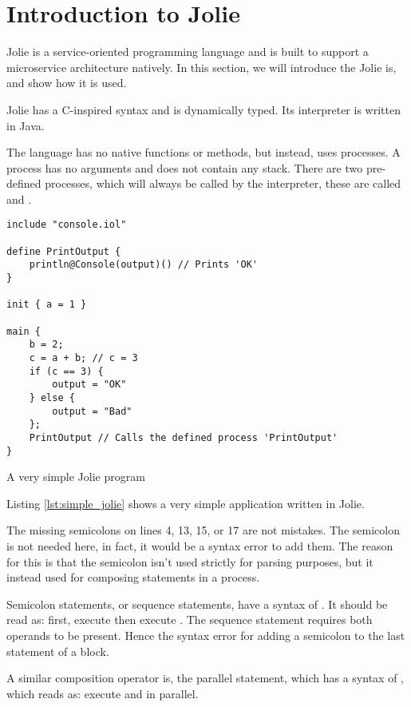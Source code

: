 \section{Introduction to Jolie}

Jolie is a service-oriented programming language and is built to support a
microservice architecture natively. In this section, we will introduce the
Jolie is, and show how it is used.

Jolie has a C-inspired syntax and is dynamically typed. Its interpreter is
written in Java.

The language has no native functions or methods, but instead, uses processes. A
process has no arguments and does not contain any stack. There are two
pre-defined processes, which will always be called by the interpreter, these
are called  and .

\begin{listing}[H]
\begin{verbatim}
include "console.iol"

define PrintOutput {
    println@Console(output)() // Prints 'OK'
}

init { a = 1 }

main {
    b = 2;
    c = a + b; // c = 3
    if (c == 3) {
        output = "OK"
    } else {
        output = "Bad"
    };
    PrintOutput // Calls the defined process 'PrintOutput'
}
\end{verbatim}
\caption{A very simple Jolie program}
\label{lst:simple_jolie}
\end{listing}

Listing \ref{lst:simple_jolie} shows a very simple application written in
Jolie.

The missing semicolons on lines 4, 13, 15, or 17 are not mistakes. The
semicolon is not needed here, in fact, it would be a syntax error to add them.
The reason for this is that the semicolon isn't used strictly for parsing
purposes, but it instead used for composing statements in a process.

Semicolon statements, or sequence statements, have a syntax of .
It should be read as: first, execute  then execute . The
sequence statement requires both operands to be present. Hence the syntax error
for adding a semicolon to the last statement of a block.

A similar composition operator is, the parallel statement, which has a syntax
of , which reads as: execute  and  in
parallel.

